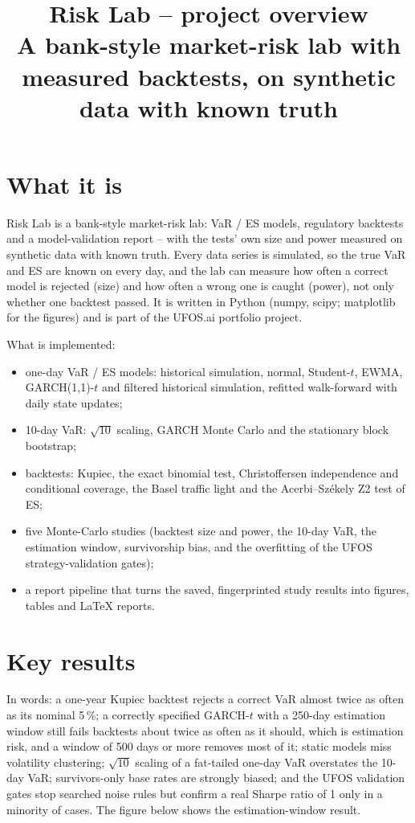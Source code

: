 \documentclass[11pt,a4paper]{article}
\title{Risk Lab -- project overview\\[0.3em]
  \large A bank-style market-risk lab with measured backtests, on synthetic data with known truth}
\author{}
\date{}
\begin{document}
\maketitle
\vspace{-2.5em}

\section*{What it is}
Risk Lab is a bank-style market-risk lab: VaR / ES models, regulatory backtests and a model-validation report --
with the tests' own size and power measured on synthetic data with known truth. Every data series is simulated,
so the true VaR and ES are known on every day, and the lab can measure how often a correct model is rejected
(size) and how often a wrong one is caught (power), not only whether one backtest passed. It is written in
Python (numpy, scipy; matplotlib for the figures) and is part of the UFOS.ai portfolio project.

What is implemented:
\begin{itemize}
\item one-day VaR / ES models: historical simulation, normal, Student-$t$, EWMA, GARCH(1,1)-$t$ and filtered
  historical simulation, refitted walk-forward with daily state updates;
\item 10-day VaR: $\sqrt{10}$ scaling, GARCH Monte Carlo and the stationary block bootstrap;
\item backtests: Kupiec, the exact binomial test, Christoffersen independence and conditional coverage, the Basel
  traffic light and the Acerbi--Sz\'ekely Z2 test of ES;
\item five Monte-Carlo studies (backtest size and power, the 10-day VaR, the estimation window, survivorship
  bias, and the overfitting of the UFOS strategy-validation gates);
\item a report pipeline that turns the saved, fingerprinted study results into figures, tables and LaTeX
  reports.
\end{itemize}



\section*{Key results}

In words: a one-year Kupiec backtest rejects a correct VaR almost twice as often as its nominal 5\,\%; a correctly
specified GARCH-$t$ with a 250-day estimation window still fails backtests about twice as often as it should,
which is estimation risk, and a window of 500 days or more removes most of it; static models miss volatility
clustering; $\sqrt{10}$ scaling of a fat-tailed one-day VaR overstates the 10-day VaR; survivors-only base rates
are strongly biased; and the UFOS validation gates stop searched noise rules but confirm a real Sharpe ratio of
1 only in a minority of cases. The figure below shows the estimation-window result.
\end{document}
